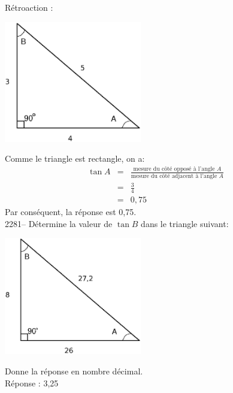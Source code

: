 \documentclass[letterpaper, 12pt]{article}
\begin{document}
R\'etroaction :\\
\begin{center}
 \includegraphics[width=6cm,bb=14 14 445 371]{Triangle_rectangle2276.eps}
\end{center}
Comme le triangle est rectangle, on a:
\begin{eqnarray*}
 \tan{A}&=&\frac{\textrm{mesure du c\^ot\'e oppos\'e \`a l'angle $A$}}{\textrm{mesure du c\^ot\'e adjacent \`a l'angle $A$}}\\
&=&\frac{3}{4}\\[2mm]
&=&0,75
\end{eqnarray*}
Par cons\'equent, la r\'eponse est 0,75.\\

2281-- D\'etermine la valeur de $\tan{B}$ dans le triangle suivant:
\begin{center}
 \includegraphics[width=6cm,bb=14 14 442 370]{Triangle_rectangle2281.eps}
\end{center}
Donne la r\'eponse en nombre d\'ecimal.\\

R\'eponse : 3,25\\
\end{document}

